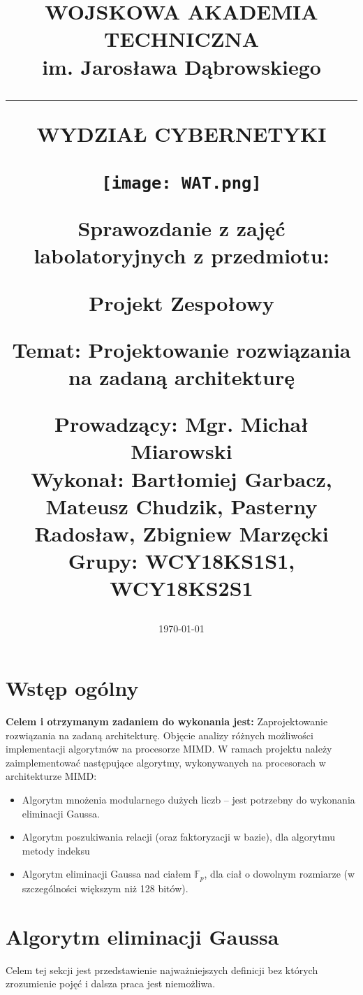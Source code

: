 \documentclass{article}
\title{
\begin{center}
  \huge{WOJSKOWA AKADEMIA TECHNICZNA} \\
  \Large{im. Jarosława Dąbrowskiego}
\end{center}
\noindent\rule{10cm}{0.4pt}

\Huge{WYDZIAŁ CYBERNETYKI}
\begin{center}
    \texttt{[image: WAT.png]}
    \end{center}
\large{Sprawozdanie z zajęć labolatoryjnych z przedmiotu:}

\Large{\textbf{Projekt Zespołowy}}


\large{Temat: Projektowanie rozwiązania na zadaną architekturę}

\begin{flushleft}
Prowadzący: Mgr. Michał Miarowski
\\
Wykonał: Bartłomiej Garbacz, Mateusz Chudzik,
\newline Pasterny Radosław, Zbigniew Marzęcki
\\
Grupy: WCY18KS1S1, WCY18KS2S1
\end{flushleft}
}
\date{\today}
\begin{document}
\maketitle

\newpage
\tableofcontents

\newpage
\section{Wstęp ogólny}
\textbf{Celem i otrzymanym zadaniem do wykonania jest:}
\newline
Zaprojektowanie rozwiązania na zadaną architekturę. Objęcie analizy różnych możliwości implementacji algorytmów na procesorze MIMD.
\newline
\newline
W ramach projektu należy zaimplementować następujące algorytmy, wykonywanych na procesorach w architekturze MIMD:
\begin{itemize}
    \item Algorytm mnożenia modularnego dużych liczb – jest potrzebny do wykonania eliminacji
     Gaussa.
    \item Algorytm poszukiwania relacji (oraz faktoryzacji w bazie), dla algorytmu metody indeksu
    \item Algorytm eliminacji Gaussa nad ciałem \begin{math}\mathbb{F}_{p} \end{math}, dla ciał o dowolnym rozmiarze (w szczególności
większym niż 128 bitów).
\end{itemize}
\newpage

\section{Algorytm eliminacji Gaussa}

Celem tej sekcji jest przedstawienie najważniejszych definicji bez których zrozumienie pojęć i dalsza praca jest niemożliwa. 
\end{document}
